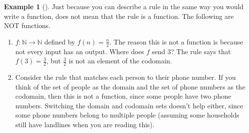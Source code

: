 \documentclass[10pt,]{book}
\theoremstyle{plain}
\theoremstyle{definition}
\theoremstyle{definition}
\newtheorem{example}[theorem]{Example}
\theoremstyle{definition}
\numberwithin{equation}{chapter}
\def\N{\mathbb N}
\begin{document}
\begin{example}[]\label{example-26}
\hypertarget{p-2086}{}%
Just because you can describe a rule in the same way you would write a function, does not mean that the rule is a function.  The following are NOT functions. \leavevmode%
\begin{enumerate}
\item\hypertarget{li-364}{}\hypertarget{p-2087}{}%
\(f:\N \to \N\) defined by \(f(n) = \frac{n}{2}\).  The reason this is not a function is because not every input has an output.  Where does \(f\) send 3?  The rule says that \(f(3) = \frac{3}{2}\), but \(\frac{3}{2}\) is not an element of the codomain.%
\item\hypertarget{li-365}{}\hypertarget{p-2088}{}%
Consider the rule that matches each person to their phone number.  If you think of the set of people as the domain and the set of phone numbers as the codomain, then this is not a function, since some people have two phone numbers.  Switching the domain and codomain sets doesn't help either, since some phone numbers belong to multiple people (assuming some households still have landlines when you are reading this).%
\end{enumerate}
%
\end{example}
\typeout{************************************************}
\typeout{************************************************}
\end{document}
